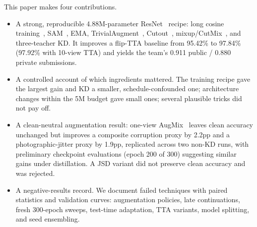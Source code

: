 This paper makes four contributions.
\begin{itemize}
\item A strong, reproducible 4.88M-parameter ResNet~\citep{he2016deep} recipe: long cosine training~\citep{loshchilov2017sgdr}, SAM~\citep{foret2021sam},
EMA, TrivialAugment~\citep{muller2021trivial}, Cutout~\citep{devries2017cutout}, mixup/CutMix~\citep{zhang2018mixup,yun2019cutmix}, and three-teacher KD. It improves a
flip-TTA baseline from 95.42\% to 97.84\% (97.92\% with 10-view TTA) and yields
the team's 0.911 public / 0.880 private submissions.
\item A controlled account of which ingredients mattered. The training recipe gave the largest gain and KD a smaller, schedule-confounded one; architecture changes within the 5M budget gave small ones;
several plausible tricks did not pay off.
\item A clean-neutral augmentation result: one-view AugMix~\citep{hendrycks2020augmix} leaves clean accuracy
unchanged but improves a composite corruption proxy by 2.2pp and a
photographic-jitter proxy by 1.9pp, replicated across two non-KD runs, with preliminary checkpoint evaluations (epoch 200 of 300) suggesting similar gains under
distillation. A JSD variant did not preserve clean accuracy and was rejected.
\item A negative-results record. We document failed techniques with paired
statistics and validation curves: augmentation policies, late continuations,
fresh 300-epoch sweeps, test-time adaptation, TTA variants, model splitting, and
seed ensembling.
\end{itemize}
